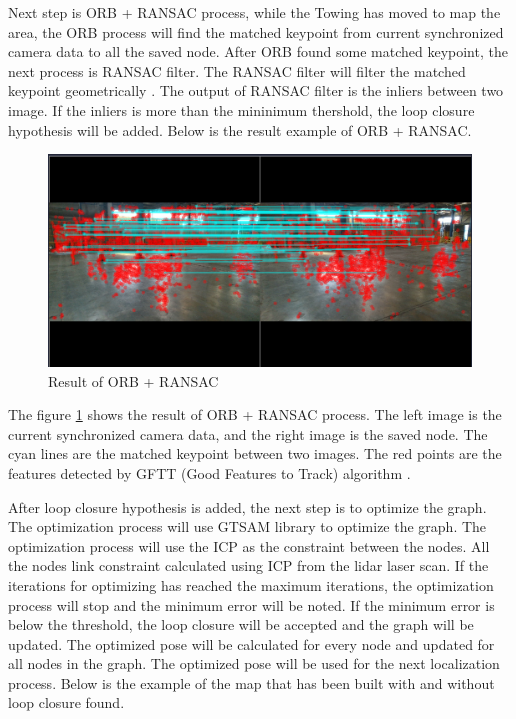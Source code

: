 \documentclass[conference]{IEEEtran}
\begin{document}
\par    
Next step is ORB + RANSAC process, while the Towing has moved to map the area, the ORB process will find the matched keypoint from current synchronized camera data to all the saved node. After ORB found some matched keypoint, the next process is RANSAC filter. The RANSAC filter will filter the matched keypoint geometrically \cite{ref_orb_ransac}. The output of RANSAC filter is the inliers between two image. If the inliers is more than the mininimum thershold, the loop closure hypothesis will be added. Below is the result example of ORB + RANSAC. 
\begin{figure}[H]
	\centering
	\includegraphics[width=\linewidth]{../konten/orb_ransac2.png}
	\caption{Result of ORB + RANSAC}
	\label{fig:orb_ransac}
\end{figure}
The figure \ref{fig:orb_ransac} shows the result of ORB + RANSAC process. The left image is the current synchronized camera data, and the right image is the saved node. The cyan lines are the matched keypoint between two images. The red points are the features detected by GFTT (Good Features to Track) algorithm \cite{ref_gftt}.
\par   
After loop closure hypothesis is added, the next step is to optimize the graph. The optimization process will use GTSAM library \cite{ref_gtsam} to optimize the graph. The optimization process will use the ICP as the constraint between the nodes. All the nodes link constraint calculated using ICP from the lidar laser scan. If the iterations for optimizing has reached the maximum iterations, the optimization process will stop and the minimum error will be noted. If the minimum error is below the threshold, the loop closure will be accepted and the graph will be updated. The optimized pose will be calculated for every node and updated for all nodes in the graph. The optimized pose will be used for the next localization process. Below is the example of the map that has been built with and without loop closure found. 
\end{document}
